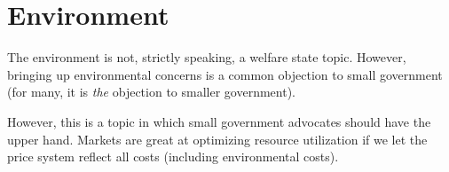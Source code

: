 \chapter{Environment}
\label{chpt:environment}

The environment is not, strictly speaking, a welfare state topic. However,
bringing up environmental concerns is a common objection to small government
(for many, it is \emph{the} objection to smaller government).

However, this is a topic in which small government advocates should have the
upper hand. Markets are great at optimizing resource utilization if we let the
price system reflect all costs (including environmental costs).


